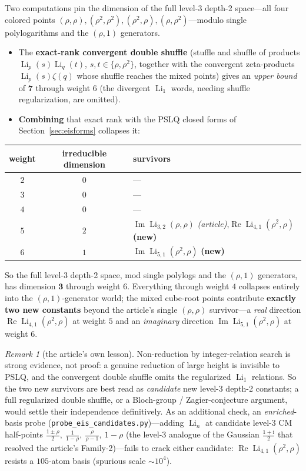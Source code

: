 \documentclass[11pt]{article}
\DeclareMathOperator{\Li}{Li}
\DeclareMathOperator{\Real}{Re}
\DeclareMathOperator{\Imag}{Im}
\newcommand{\iu}{\mathrm{i}}
\newcommand{\rr}{\rho}
\newcommand{\code}[1]{\texttt{\small #1}}
\theoremstyle{plain}
\theoremstyle{remark}
\newtheorem{remark}[theorem]{Remark}
\begin{document}
Two computations pin the dimension of the full level-3 depth-2 space---all four colored points
$(\rr,\rr),(\rr^2,\rr^2),(\rr^2,\rr),(\rr,\rr^2)$---modulo single polylogarithms and the $(\rr,1)$
generators.
\begin{itemize}
\item The \textbf{exact-rank convergent double shuffle} (stuffle and shuffle of products
  $\Li_p(s)\Li_q(t)$, $s,t\in\{\rr,\rr^2\}$, together with the convergent zeta-products
  $\Li_p(s)\zeta(q)$ whose shuffle reaches the mixed points) gives an \emph{upper bound} of $\mathbf 7$
  through weight $6$ (the divergent $\Li_1$ words, needing shuffle regularization, are omitted).
\item \textbf{Combining} that exact rank with the PSLQ closed forms of Section~\ref{sec:eisforms}
  collapses it:
\end{itemize}
\begin{center}
\begin{tabular}{ccl}
\toprule
weight & irreducible dimension & survivors\\
\midrule
$2$ & $0$ & ---\\
$3$ & $0$ & ---\\
$4$ & $0$ & ---\\
$5$ & $2$ & $\Imag\Li_{3,2}(\rr,\rr)$ \emph{(article)},\quad $\Real\Li_{4,1}(\rr^2,\rr)$ \textbf{(new)}\\
$6$ & $1$ & $\Imag\Li_{5,1}(\rr^2,\rr)$ \textbf{(new)}\\
\bottomrule
\end{tabular}
\end{center}
So the full level-3 depth-2 space, mod single polylogs and the $(\rr,1)$ generators, has dimension
$\mathbf 3$ through weight $6$. Everything through weight $4$ collapses entirely into the
$(\rr,1)$-generator world; the mixed cube-root points contribute \textbf{exactly two new constants}
beyond the article's single $(\rr,\rr)$ survivor---a \emph{real} direction $\Real\Li_{4,1}(\rr^2,\rr)$
at weight $5$ and an \emph{imaginary} direction $\Imag\Li_{5,1}(\rr^2,\rr)$ at weight $6$.

\begin{remark}[the article's own lesson]
Non-reduction by integer-relation search is strong evidence, not proof: a genuine reduction of large
height is invisible to PSLQ, and the convergent double shuffle omits the regularized $\Li_1$ relations.
So the two new survivors are best read as \emph{candidate} new level-3 depth-2 constants; a full
regularized double shuffle, or a Bloch-group / Zagier-conjecture argument, would settle their
independence definitively. As an additional check, an \emph{enriched}-basis probe
(\code{probe\_eis\_candidates.py})---adding $\Li_n$ at candidate level-3 CM half-points
$\tfrac{1\pm\rr}2,\ \tfrac1{1-\rr},\ \tfrac{\rr}{\rr-1},\ 1-\rr$ (the level-3 analogue of the Gaussian
$\tfrac{1+\iu}2$ that resolved the article's Family-2)---fails to crack either candidate:
$\Real\Li_{4,1}(\rr^2,\rr)$ resists a $105$-atom basis (spurious scale ${\sim}10^{4}$).
\end{remark}
\end{document}
